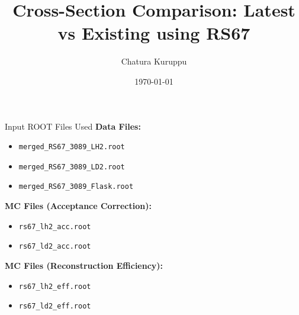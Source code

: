 \documentclass[aspectratio=169]{beamer}
\title{Cross-Section Comparison: Latest vs Existing using RS67}
\author{Chatura Kuruppu}
\institute{New Mexico State University}
\date{\today}
\begin{document}
\begin{frame}
    \titlepage
\end{frame}

\begin{frame}{Input ROOT Files Used}
    \textbf{Data Files:}
    \begin{itemize}
        \item \texttt{merged\_RS67\_3089\_LH2.root}
        \item \texttt{merged\_RS67\_3089\_LD2.root}
        \item \texttt{merged\_RS67\_3089\_Flask.root}
    \end{itemize}
    \vspace{0.2cm}
    
    \textbf{MC Files (Acceptance Correction):}
    \begin{itemize}
        \item \texttt{rs67\_lh2\_acc.root}
        \item \texttt{rs67\_ld2\_acc.root}
    \end{itemize}
    \vspace{0.2cm}

    \textbf{MC Files (Reconstruction Efficiency):}
    \begin{itemize}
        \item \texttt{rs67\_lh2\_eff.root}
        \item \texttt{rs67\_ld2\_eff.root}
    \end{itemize}
\end{frame}
\end{document}
